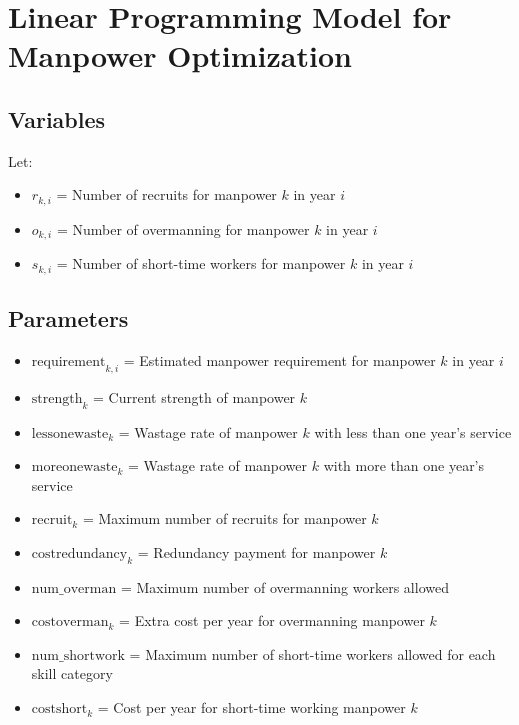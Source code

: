 \documentclass{article}
\begin{document}
\section*{Linear Programming Model for Manpower Optimization}

\subsection*{Variables}
Let:
\begin{itemize}
    \item \( r_{k, i} \) = Number of recruits for manpower \( k \) in year \( i \)
    \item \( o_{k, i} \) = Number of overmanning for manpower \( k \) in year \( i \)
    \item \( s_{k, i} \) = Number of short-time workers for manpower \( k \) in year \( i \)
\end{itemize}

\subsection*{Parameters}
\begin{itemize}
    \item \( \text{requirement}_{k,i} \) = Estimated manpower requirement for manpower \( k \) in year \( i \)
    \item \( \text{strength}_{k} \) = Current strength of manpower \( k \)
    \item \( \text{lessonewaste}_{k} \) = Wastage rate of manpower \( k \) with less than one year's service
    \item \( \text{moreonewaste}_{k} \) = Wastage rate of manpower \( k \) with more than one year's service
    \item \( \text{recruit}_{k} \) = Maximum number of recruits for manpower \( k \)
    \item \( \text{costredundancy}_{k} \) = Redundancy payment for manpower \( k \)
    \item \( \text{num\_overman} \) = Maximum number of overmanning workers allowed
    \item \( \text{costoverman}_{k} \) = Extra cost per year for overmanning manpower \( k \)
    \item \( \text{num\_shortwork} \) = Maximum number of short-time workers allowed for each skill category
    \item \( \text{costshort}_{k} \) = Cost per year for short-time working manpower \( k \)
\end{itemize}
\end{document}
